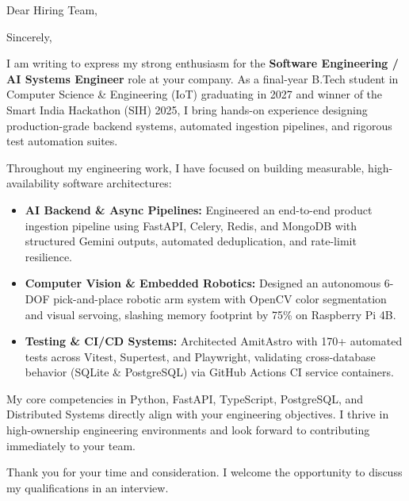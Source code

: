\documentclass[11pt,a4paper,sans]{moderncv}
\begin{document}
\date{\today}
\opening{Dear Hiring Team,}
\closing{Sincerely,}

\makelettertitle

I am writing to express my strong enthusiasm for the \textbf{Software Engineering / AI Systems Engineer} role at your company. As a final-year B.Tech student in Computer Science \& Engineering (IoT) graduating in 2027 and winner of the Smart India Hackathon (SIH) 2025, I bring hands-on experience designing production-grade backend systems, automated ingestion pipelines, and rigorous test automation suites.

Throughout my engineering work, I have focused on building measurable, high-availability software architectures:
\begin{itemize}
    \item \textbf{AI Backend \& Async Pipelines:} Engineered an end-to-end product ingestion pipeline using FastAPI, Celery, Redis, and MongoDB with structured Gemini outputs, automated deduplication, and rate-limit resilience.
    \item \textbf{Computer Vision \& Embedded Robotics:} Designed an autonomous 6-DOF pick-and-place robotic arm system with OpenCV color segmentation and visual servoing, slashing memory footprint by 75\% on Raspberry Pi 4B.
    \item \textbf{Testing \& CI/CD Systems:} Architected AmitAstro with 170+ automated tests across Vitest, Supertest, and Playwright, validating cross-database behavior (SQLite \& PostgreSQL) via GitHub Actions CI service containers.
\end{itemize}

My core competencies in Python, FastAPI, TypeScript, PostgreSQL, and Distributed Systems directly align with your engineering objectives. I thrive in high-ownership engineering environments and look forward to contributing immediately to your team.

Thank you for your time and consideration. I welcome the opportunity to discuss my qualifications in an interview.

\vspace{10pt}
\makeletterclosing
\end{document}
